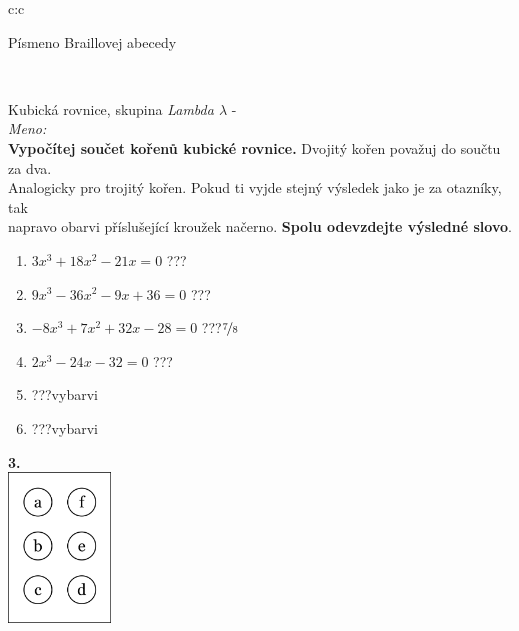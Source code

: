 \documentclass[10pt]{report}
\begin{document}
\begin{tabular}{c:c}
\begin{minipage}[c][99mm][t]{0.49\linewidth}
\begin{center}
\begin{minipage}{0.20\linewidth}
\begin{center}
{\small Písmeno Braillovej abecedy}
\end{center}
\end{minipage}
\end{center}
\end{minipage}
\\ \hdashline
\begin{minipage}[c][99mm][t]{0.49\linewidth}
\begin{center}
\vspace{7mm}
{\huge Kubická rovnice, skupina \textit{Lambda $\lambda$} -}\\[4.5mm]
\textit{Meno:}\phantom{xxxxxxxxxxxxxxxxxxxxxxxxxxxxxxxxxxxxxxxxxxxxxxxxxxxxxxxxxxxxxxxxx}\\[3.5mm]
\textbf{Vypočítej součet kořenů kubické rovnice.} Dvojitý kořen považuj do součtu za dva.\\Analogicky pro trojitý kořen. Pokud ti vyjde stejný výsledek jako je za otazníky, tak\\napravo obarvi příslušející kroužek načerno. \textbf{Spolu odevzdejte výsledné slovo}.\\[3mm]
\begin{minipage}{0.77\linewidth}
\begin{center}
\begin{varwidth}{\textwidth}
\begin{enumerate}
\large
\item $3x^3+18x^2-21x=0$\quad \dotfill\; ???\;\dotfill {}
\item $9x^3-36x^2-9x+36=0$\quad \dotfill\; ???\;\dotfill {}
\item $-8x^3+7x^2+32x-28=0$\quad \dotfill\; ???\;\dotfill \quad $\nicefrac{7}{8}$
\item $2x^3-24x-32=0$\quad \dotfill\; ???\;\dotfill {}
\item \quad \dotfill\; ???\;\dotfill \quad vybarvi
\item \quad \dotfill\; ???\;\dotfill \quad vybarvi
\end{enumerate}
\end{varwidth}
\end{center}
\end{minipage}
\begin{minipage}{0.20\linewidth}
\begin{center}
{\Huge\bfseries 3.} \\[2mm]
\includegraphics[height=40mm]{../images/braille.png}

\end{center}
\end{minipage}
\end{center}
\end{minipage}
\end{tabular}
\end{document}
